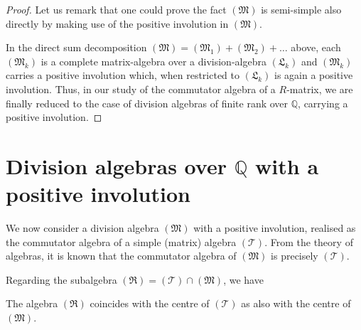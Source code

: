 \begin{proof}
Let us remark that one could prove the fact $(\mathfrak{M})$ is
semi-simple also directly by making use of the positive involution in
$(\mathfrak{M})$. 

In the direct sum decomposition $(\mathfrak{M}) = (\mathfrak{M}_1) +
(\mathfrak{M}_2) + \ldots$ above, each $(\mathfrak{M}_k)$ is a
complete matrix-algebra over a division-algebra $(\mathfrak{L}_k)$
and $(\mathfrak{M}_k)$ carries a positive involution which, when
restricted to $(\mathfrak{L}_k)$ is again a positive involution. Thus,
in our study of the commutator algebra of a $R$-matrix, we are finally
reduced to the case of division algebras of finite rank over
$\mathbb{Q}$, carrying a positive involution.
\end{proof}

\section{Division algebras over $\mathbb{Q}$ with a positive involution}

We now consider a division algebra $(\mathfrak{M})$ with a positive
involution, realised as the commutator algebra of a simple (matrix)
algebra $(\mathscr{T})$. From the theory of algebras, it is known that
the commutator algebra of $(\mathfrak{M})$ is precisely
$(\mathscr{T})$.

Regarding the subalgebra $(\mathfrak{R}) = (\mathscr{T}) \cap
(\mathfrak{M})$, we have 

\begin{proposition}\label{chap1:prop6}
The algebra $(\mathfrak{R})$ coincides with the centre of
$(\mathscr{T})$ as also with the centre of $(\mathfrak{M})$. 
\end{proposition}


